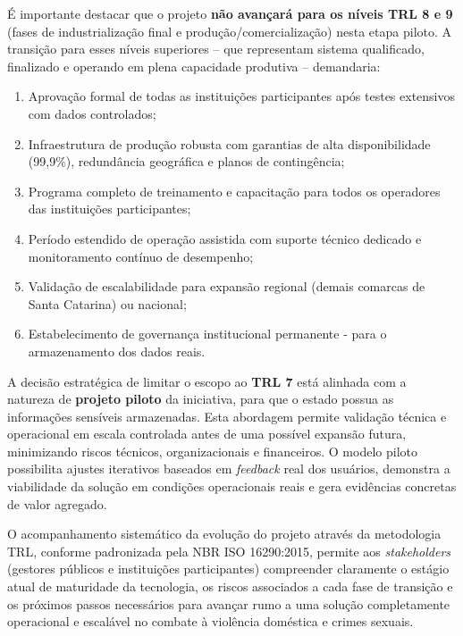\par É importante destacar que o projeto \textbf{não avançará para os níveis TRL 8 e 9} (fases de industrialização final e produção/comercialização) nesta etapa piloto. A transição para esses níveis superiores -- que representam sistema qualificado, finalizado e operando em plena capacidade produtiva -- demandaria:

\begin{enumerate}
   \item Aprovação formal de todas as instituições participantes após testes extensivos com dados controlados;
   \item Infraestrutura de produção robusta com garantias de alta disponibilidade (99,9\%), redundância geográfica e planos de contingência;
   \item Programa completo de treinamento e capacitação para todos os operadores das instituições participantes;
   \item Período estendido de operação assistida com suporte técnico dedicado e monitoramento contínuo de desempenho;
   \item Validação de escalabilidade para expansão regional (demais comarcas de Santa Catarina) ou nacional;
   \item Estabelecimento de governança institucional permanente - para o armazenamento dos dados reais.
\end{enumerate}

\par A decisão estratégica de limitar o escopo ao \textbf{TRL 7} está alinhada com a natureza de \textbf{projeto piloto} da iniciativa, para que o estado possua as informações sensíveis armazenadas. Esta abordagem permite validação técnica e operacional em escala controlada antes de uma possível expansão futura, minimizando riscos técnicos, organizacionais e financeiros. O modelo piloto possibilita ajustes iterativos baseados em \textit{feedback} real dos usuários, demonstra a viabilidade da solução em condições operacionais reais e gera evidências concretas de valor agregado.

\par O acompanhamento sistemático da evolução do projeto através da metodologia TRL, conforme padronizada pela NBR ISO 16290:2015, permite aos \textit{stakeholders} (gestores públicos e instituições participantes) compreender claramente o estágio atual de maturidade da tecnologia, os riscos associados a cada fase de transição e os próximos passos necessários para avançar rumo a uma solução completamente operacional e escalável no combate à violência doméstica e crimes sexuais.

